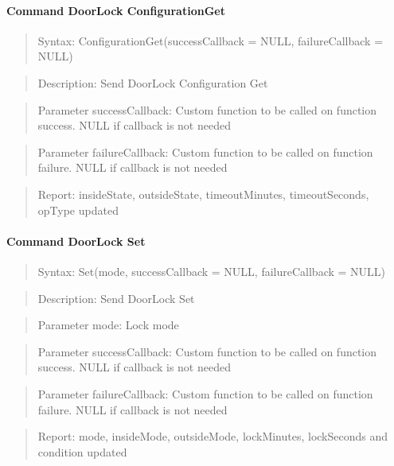 \paragraph{Command DoorLock ConfigurationGet}
\begin{quote}Syntax: ConfigurationGet(successCallback = NULL, failureCallback = NULL)\end{quote}
\begin{quote}Description: Send DoorLock Configuration Get\end{quote}
\begin{quote}Parameter successCallback: Custom function to be called on function success. NULL if callback is not needed\end{quote}
\begin{quote}Parameter failureCallback: Custom function to be called on function failure. NULL if callback is not needed\end{quote}
\begin{quote}Report: insideState, outsideState, timeoutMinutes, timeoutSeconds, opType updated\end{quote}

\paragraph{Command DoorLock Set}
\begin{quote}Syntax: Set(mode, successCallback = NULL, failureCallback = NULL)\end{quote}
\begin{quote}Description: Send DoorLock Set\end{quote}
\begin{quote}Parameter mode: Lock mode\end{quote}
\begin{quote}Parameter successCallback: Custom function to be called on function success. NULL if callback is not needed\end{quote}
\begin{quote}Parameter failureCallback: Custom function to be called on function failure. NULL if callback is not needed\end{quote}
\begin{quote}Report: mode, insideMode, outsideMode, lockMinutes, lockSeconds and condition updated\end{quote}

